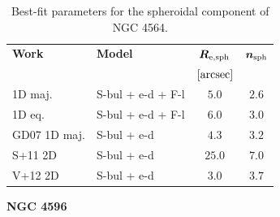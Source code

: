 \documentclass[preprint2]{emulateapj}
\begin{document}
  \begin{table}[h]
  \small
  \caption{Best-fit parameters for the spheroidal component of NGC 4564.}
  \begin{center}
  \begin{tabular}{llcc}
  \hline
  {\bf Work} & {\bf Model}   & $\bm R_{\rm e,sph}$    & $\bm n_{\rm sph}$ \\
    &  &  $[\rm arcsec]$ & \\
  \hline
  1D maj. & S-bul + e-d + F-l & $5.0$  &  $2.6$ \\
  1D eq.  & S-bul + e-d + F-l & $6.0$  &  $3.0$ \\
  \hline
  GD07 1D maj.      & S-bul + e-d & $4.3$  &  $3.2$ \\
  S+11 2D      & S-bul + e-d & $25.0$ &  $7.0$ \\
  V+12 2D      & S-bul + e-d & $3.0$  &  $3.7$ \\
  \hline
  \end{tabular}
  \end{center}
  \label{tab:n4564}
  \end{table}

  \clearpage\newpage\noindent
  {\bf NGC 4596 \\}
\end{document}
